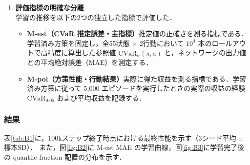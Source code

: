 \documentclass[a4paper,10pt]{jsarticle}
\theoremstyle{definition}
\newcommand{\CVaR}{\mathrm{CVaR}}
\begin{document}
\begin{enumerate}
  \item \textbf{評価指標の明確な分離}\\
  学習の推移を以下の2つの独立した指標で評価した．
  \begin{itemize}
    \item \textbf{M-est（CVaR 推定誤差・主指標）}\quad 推定値の正確さを測る指標である．学習済み方策を固定し，全55状態 $\times$ 2行動において $10^4$ 本のロールアウトで高精度に算出した参照値 $\widetilde{\mathrm{CVaR}}_\alpha(s, a)$ と，ネットワークの出力値との平均絶対誤差（MAE）を測定する．
    \item \textbf{M-pol（方策性能・行動結果）}\quad 実際に得た収益を測る指標である．学習済み方策に従って 5,000 エピソードを実行したときの実際の収益の経験 $\CVaR_{0.05}$ および平均収益を記録する．
  \end{itemize}
\end{enumerate}

\subsubsection{結果}

表\ref{tab:B1}に，100kステップ終了時点における最終性能を示す（3シード平均 $\pm$ 標本SD）．
また，図\ref{fig:B2}に M-est MAE の学習曲線，図\ref{fig:B3}に学習完了後の quantile fraction 配置の分布を示す．
\end{document}
